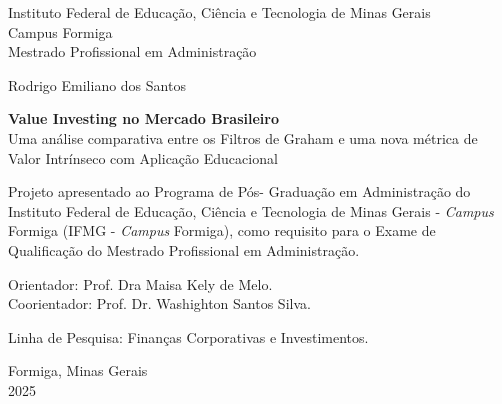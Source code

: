 
\thispagestyle{empty}

\begin{center}
    \small
    \sc Instituto Federal de Educação, Ciência e Tecnologia de Minas Gerais \\ 
    \sc Campus Formiga \\
    \sc Mestrado Profissional em Administração
    
   
    \vspace{3cm}
    \large {Rodrigo Emiliano dos Santos}
    
    \vspace{3cm}
     \large \textbf{Value Investing no Mercado Brasileiro} \\
    Uma análise comparativa entre os Filtros de Graham e uma nova métrica de Valor Intrínseco com Aplicação Educacional
    
    \vspace{2cm}
    \begin{flushright}
    \begin{minipage}{0.6\textwidth}
    \small
    Projeto apresentado ao Programa de Pós-
    Graduação em Administração do Instituto
    Federal de Educação, Ciência e
    Tecnologia de Minas Gerais - \textit{Campus} Formiga 
    (IFMG - \textit{Campus} Formiga), como requisito para 
    o Exame de Qualificação do Mestrado Profissional em 
    Administração.
    \end{minipage}
    \end{flushright}
    
    \vspace{0.5cm}
    \begin{flushright}
    \small
    Orientador: Prof. Dra Maisa Kely de Melo.\\
    Coorientador: Prof. Dr. Washighton Santos Silva.
    
    \vspace{0.5cm}
    Linha de Pesquisa: Finanças Corporativas e Investimentos.
    \end{flushright}
    
    \vfill
    Formiga, Minas Gerais \\
    2025
\end{center}


\newpage

\thispagestyle{empty}

\newenvironment{meuresumo}{
  \clearpage
  \small
  \vspace{-1cm}
  \begin{center}
    \bfseries RESUMO
    \vspace{0.5em}
  \end{center}
  \begin{quote}
}{
  \end{quote}
  \vspace{-1.1em}
  \begin{center}
  \begin{minipage}{0.87\textwidth} 
  \textbf{Palavras-chave:} value investing, valor intrínseco, Benjamin Graham.
  \end{minipage}
  \end{center}
  \clearpage
}

